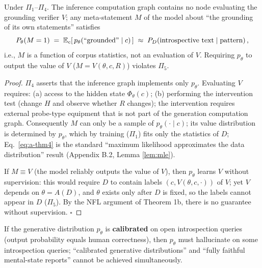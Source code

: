 \begin{restate}[Theorems 4a/4b]
Under $\Pi_1$--$\Pi_4$. The inference computation graph contains no node evaluating the
grounding verifier $V$; any meta-statement $M$ of the model about ``the grounding of its own
statements'' satisfies
\begin{equation}
P_\theta(M = 1) \;=\; \mathbb{E}_{c}\!\left[\, p_\theta\!\left(\text{``grounded''} \mid c\right) \,\right]
\;\approx\; P_{D}\!\left(\text{introspective text} \mid \text{pattern}\right),
\label{eq:a-thm4}
\end{equation}
i.e., $M$ is a function of corpus statistics, not an evaluation of $V$. Requiring $p_\theta$
to output the value of $V$ ($M = V(\theta, c, R)$) violates $\Pi_5$.
\end{restate}

\begin{proof}
$\Pi_4$ asserts that the inference graph implements only $p_\theta$. Evaluating $V$ requires:
(a) access to the hidden state $\Phi_\theta(c)$; (b) performing the intervention test (change
$H$ and observe whether $R$ changes); the intervention requires external probe-type
equipment that is not part of the generation computation graph. Consequently $M$ can only be a
sample
of $p_\theta(\cdot \mid c)$; its value distribution is determined by $p_\theta$, which by
training ($\Pi_1$) fits only the statistics of $D$; Eq.~\eqref{eq:a-thm4} is the standard
``maximum likelihood approximates the data distribution'' result (Appendix B.2, Lemma
\ref{lem:mle}).

If $M \equiv V$ (the model reliably outputs the value of $V$), then $p_\theta$ learns $V$
without supervision: this would require $D$ to contain labels $(c, V(\theta, c, \cdot))$ of
$V$; yet $V$ depends on $\theta = A(D)$, and $\theta$ exists only after $D$ is fixed, so
the labels cannot appear in $D$ ($\Pi_5$). By the NFL argument of Theorem 1b, there is no
guarantee without supervision. $\square$
\end{proof}

\begin{restate}
If the generative distribution $p_\theta$ is \textbf{calibrated} on open introspection queries
(output probability equals human correctness), then $p_\theta$ must hallucinate on some
introspection queries; ``calibrated generative distributions'' and ``fully faithful mental-state
reports'' cannot be achieved simultaneously.
\end{restate}


